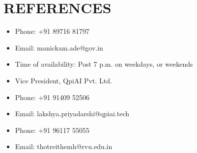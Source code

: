 \section*{REFERENCES} 

\begin{itemize}
  \item Phone: +91 89716 81797
  \item Email: manickam.ade@gov.in
  \item Time of availability: Post 7 p.m. on weekdays, or weekends
\end{itemize}

\begin{itemize}
  \item Vice President, QpiAI Pvt. Ltd.
  \item Phone: +91 91409 52506
  \item Email: lakshya.priyadarshi@qpiai.tech
\end{itemize}

\begin{itemize}
  \item Phone: +91 96117 55055
  \item Email: thotreithemh@rvu.edu.in
\end{itemize}